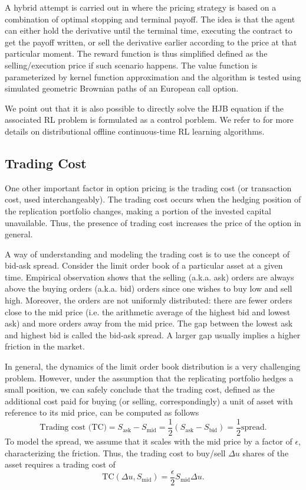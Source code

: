 A hybrid attempt is carried out in \cite{grassl2010reinforcement}
where the pricing strategy is based on a combination of optimal stopping
and terminal payoff. The idea is that the agent can either hold the
derivative until the terminal time, executing the contract to get
the payoff written, or sell the derivative earlier according to the
price at that particular moment. The reward function is thus simplified
defined as the selling/execution price if such scenario happens. The
value function is parameterized by kernel function approximation and
the algorithm is tested using simulated geometric Brownian paths of
an European call option.

We point out that it is also possible to directly solve the HJB equation
if the associated RL problem is formulated as a control porblem. We
refer to \cite{halperin2021distributional} for more details on distributional
offline continuous-time RL learning algorithms.

\subsection{Trading Cost \label{subsec:Trading-Cost}}

One other important factor in option pricing is the trading cost (or
transaction cost, used interchangeably). The trading cost occurs when
the hedging position of the replication portfolio changes, making
a portion of the invested capital unavailable. Thus, the presence
of trading cost increases the price of the option in general.

A way of understanding and modeling the trading cost is to use the
concept of bid-ask spread. Consider the limit order book of a particular
asset at a given time. Empirical observation shows that the selling
(a.k.a. ask) orders are always above the buying orders (a.k.a. bid)
orders since one wishes to buy low and sell high. Moreover, the orders
are not uniformly distributed: there are fewer orders close to the
mid price (i.e. the arithmetic average of the highest bid and lowest
ask) and more orders away from the mid price. The gap between the
lowest ask and highest bid is called the bid-ask spread. A larger
gap usually implies a higher friction in the market.

In general, the dynamics of the limit order book distribution is a
very challenging problem. However, under the assumption that the replicating
portfolio hedges a small position, we can safely conclude that the
trading cost, defined as the additional cost paid for buying (or selling,
correspondingly) a unit of asset with reference to its mid price,
can be computed as follows
\[
\text{Trading cost (TC)}=S_{\text{ask}}-S_{\text{mid}}=\frac{1}{2}\left(S_{\text{ask}}-S_{\text{bid}}\right)=\frac{1}{2}\text{spread}.
\]
To model the spread, we assume that it scales with the mid price by
a factor of $\epsilon$, characterizing the friction. Thus, the trading
cost to buy/sell $\Delta u$ shares of the asset requires a trading
cost of
\[
\text{TC}\left(\Delta u,S_{\text{mid}}\right)=\frac{\epsilon}{2}S_{\text{mid}}\Delta u.
\]
